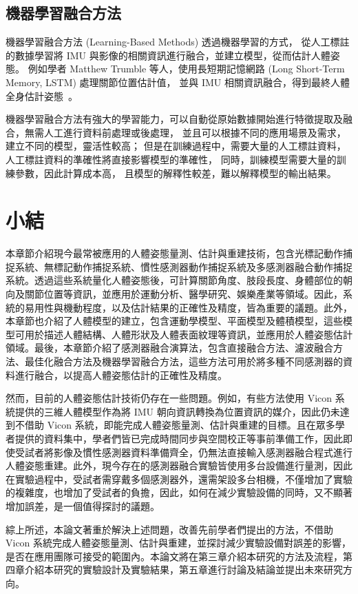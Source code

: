\subsection*{機器學習融合方法}
機器學習融合方法 (Learning-Based Methods) 透過機器學習的方式，
從人工標註的數據學習將 IMU 與影像的相關資訊進行融合，並建立模型，從而估計人體姿態。
例如學者 Matthew Trumble 等人，使用長短期記憶網路 (Long Short-Term Memory, LSTM) 處理關節位置估計值，
並與 IMU 相關資訊融合，得到最終人體全身估計姿態~\cite{Trumble:BMVC:2017}。

機器學習融合方法有強大的學習能力，可以自動從原始數據開始進行特徵提取及融合，無需人工進行資料前處理或後處理，
並且可以根據不同的應用場景及需求，建立不同的模型，靈活性較高；
但是在訓練過程中，需要大量的人工標註資料，人工標註資料的準確性將直接影響模型的準確性，
同時，訓練模型需要大量的訓練參數，因此計算成本高，
且模型的解釋性較差，難以解釋模型的輸出結果。

\section{小結}
本章節介紹現今最常被應用的人體姿態量測、估計與重建技術，包含光標記動作捕捉系統、無標記動作捕捉系統、慣性感測器動作捕捉系統及多感測器融合動作捕捉系統。透過這些系統量化人體姿態後，可計算關節角度、肢段長度、身體部位的朝向及關節位置等資訊，並應用於運動分析、醫學研究、娛樂產業等領域。因此，系統的易用性與機動程度，以及估計結果的正確性及精度，皆為重要的議題。此外，本章節也介紹了人體模型的建立，包含運動學模型、平面模型及體積模型，這些模型可用於描述人體結構、人體形狀及人體表面紋理等資訊，並應用於人體姿態估計領域。最後，本章節介紹了感測器融合演算法，包含直接融合方法、濾波融合方法、最佳化融合方法及機器學習融合方法，這些方法可用於將多種不同感測器的資料進行融合，以提高人體姿態估計的正確性及精度。

然而，目前的人體姿態估計技術仍存在一些問題。例如，有些方法使用 Vicon 系統提供的三維人體模型作為將 IMU 朝向資訊轉換為位置資訊的媒介，因此仍未達到不借助 Vicon 系統，即能完成人體姿態量測、估計與重建的目標。且在眾多學者提供的資料集中，學者們皆已完成時間同步與空間校正等事前準備工作，因此即使受試者將影像及慣性感測器資料準備齊全，仍無法直接輸入感測器融合程式進行人體姿態重建。此外，現今存在的感測器融合實驗皆使用多台設備進行量測，因此在實驗過程中，受試者需穿戴多個感測器外，還需架設多台相機，不僅增加了實驗的複雜度，也增加了受試者的負擔，因此，如何在減少實驗設備的同時，又不顯著增加誤差，是一個值得探討的議題。

綜上所述，本論文著重於解決上述問題，改善先前學者們提出的方法，不借助 Vicon 系統完成人體姿態量測、估計與重建，並探討減少實驗設備對誤差的影響，是否在應用團隊可接受的範圍內。本論文將在第三章介紹本研究的方法及流程，第四章介紹本研究的實驗設計及實驗結果，第五章進行討論及結論並提出未來研究方向。

\clearpage